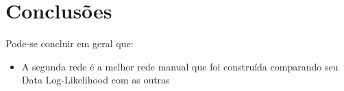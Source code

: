 \section{Conclusões}
	Pode-se concluir em geral que:\\
	\begin{itemize}
		\item A segunda rede é a melhor rede manual que foi construída comparando seu Data Log-Likelihood com as outras
	\end{itemize}

\clearpage